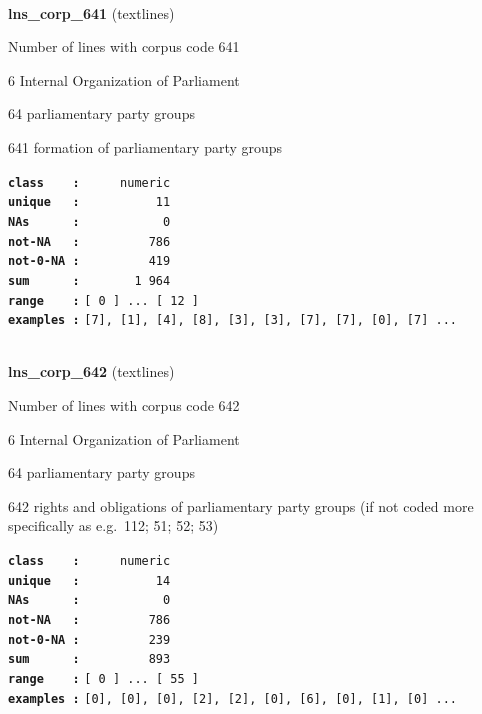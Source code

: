 \documentclass[]{article}
\begin{document}
~

\textbf{lns\_corp\_641} (textlines)

Number of lines with corpus code 641

6 Internal Organization of Parliament

64 parliamentary party groups

641 formation of parliamentary party groups

\textbf{\texttt{class\ \ \ \ :}} \texttt{~~~~~numeric}\\
\textbf{\texttt{unique\ \ \ :}} \texttt{~~~~~~~~~~11}\\
\textbf{\texttt{NAs\ \ \ \ \ \ :}} \texttt{~~~~~~~~~~~0}\\
\textbf{\texttt{not-NA\ \ \ :}} \texttt{~~~~~~~~~786}\\
\textbf{\texttt{not-0-NA\ :}} \texttt{~~~~~~~~~419}\\
\textbf{\texttt{sum\ \ \ \ \ \ :}} \texttt{~~~~~~~1~964}\\
\textbf{\texttt{range\ \ \ \ :}}
\texttt{{[}\ 0\ {]}\ ...\ {[}\ 12\ {]}}\\
\textbf{\texttt{examples\ :}}
\texttt{{[}7{]},\ {[}1{]},\ {[}4{]},\ {[}8{]},\ {[}3{]},\ {[}3{]},\ {[}7{]},\ {[}7{]},\ {[}0{]},\ {[}7{]}\ ...}\\

~

\textbf{lns\_corp\_642} (textlines)

Number of lines with corpus code 642

6 Internal Organization of Parliament

64 parliamentary party groups

642 rights and obligations of parliamentary party groups (if not coded
more specifically as e.g.~112; 51; 52; 53)

\textbf{\texttt{class\ \ \ \ :}} \texttt{~~~~~numeric}\\
\textbf{\texttt{unique\ \ \ :}} \texttt{~~~~~~~~~~14}\\
\textbf{\texttt{NAs\ \ \ \ \ \ :}} \texttt{~~~~~~~~~~~0}\\
\textbf{\texttt{not-NA\ \ \ :}} \texttt{~~~~~~~~~786}\\
\textbf{\texttt{not-0-NA\ :}} \texttt{~~~~~~~~~239}\\
\textbf{\texttt{sum\ \ \ \ \ \ :}} \texttt{~~~~~~~~~893}\\
\textbf{\texttt{range\ \ \ \ :}}
\texttt{{[}\ 0\ {]}\ ...\ {[}\ 55\ {]}}\\
\textbf{\texttt{examples\ :}}
\texttt{{[}0{]},\ {[}0{]},\ {[}0{]},\ {[}2{]},\ {[}2{]},\ {[}0{]},\ {[}6{]},\ {[}0{]},\ {[}1{]},\ {[}0{]}\ ...}\\
\end{document}
